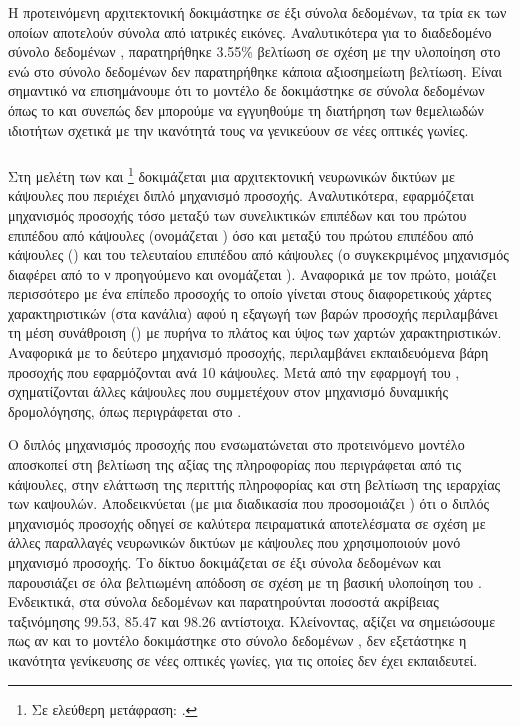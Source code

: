 Η προτεινόμενη αρχιτεκτονική δοκιμάστηκε σε έξι σύνολα δεδομένων, τα τρία εκ των οποίων αποτελούν σύνολα από ιατρικές εικόνες. Αναλυτικότερα για το διαδεδομένο σύνολο δεδομένων , παρατηρήθηκε 3.55\% βελτίωση σε σχέση με την υλοποίηση στο \cite{sabour2017dynamic} ενώ στο σύνολο δεδομένων  δεν παρατηρήθηκε κάποια αξιοσημείωτη βελτίωση. Είναι σημαντικό να επισημάνουμε ότι το μοντέλο δε δοκιμάστηκε σε σύνολα δεδομένων όπως το  και συνεπώς δεν μπορούμε να εγγυηθούμε τη διατήρηση των θεμελιωδών ιδιοτήτων σχετικά με την ικανότητά τους να γενικεύουν σε νέες οπτικές γωνίες.

\subsubsection{}

Στη μελέτη των  και  \footnote{Σε ελεύθερη μετάφραση: .} \cite{huang2020capsnet} δοκιμάζεται μια αρχιτεκτονική νευρωνικών δικτύων με κάψουλες που περιέχει διπλό μηχανισμό προσοχής. Αναλυτικότερα, εφαρμόζεται μηχανισμός προσοχής τόσο μεταξύ των συνελικτικών επιπέδων και του πρώτου επιπέδου από κάψουλες (ονομάζεται ) όσο και μεταξύ του πρώτου επιπέδου από κάψουλες () και του τελευταίου επιπέδου από κάψουλες (ο συγκεκριμένος μηχανισμός διαφέρει από το ν προηγούμενο και ονομάζεται ). Αναφορικά με τον πρώτο, μοιάζει περισσότερο με ένα επίπεδο προσοχής το οποίο γίνεται στους διαφορετικούς χάρτες χαρακτηριστικών (στα κανάλια) αφού η εξαγωγή των βαρών προσοχής περιλαμβάνει τη μέση συνάθροιση () με πυρήνα το πλάτος και ύψος των χαρτών χαρακτηριστικών. Αναφορικά με το δεύτερο μηχανισμό προσοχής, περιλαμβάνει εκπαιδευόμενα βάρη προσοχής που εφαρμόζονται ανά 10 κάψουλες. Μετά από την εφαρμογή του , σχηματίζονται άλλες κάψουλες που συμμετέχουν στον μηχανισμό δυναμικής δρομολόγησης, όπως περιγράφεται στο \cite{sabour2017dynamic}.\par

Ο διπλός μηχανισμός προσοχής που ενσωματώνεται στο προτεινόμενο μοντέλο αποσκοπεί στη βελτίωση της αξίας της πληροφορίας που περιγράφεται από τις κάψουλες, στην ελάττωση της περιττής πληροφορίας και στη βελτίωση της ιεραρχίας των καψουλών. Αποδεικνύεται (με μια διαδικασία που προσομοιάζει ) ότι ο διπλός μηχανισμός προσοχής οδηγεί σε καλύτερα πειραματικά αποτελέσματα σε σχέση με άλλες παραλλαγές νευρωνικών δικτύων με κάψουλες που χρησιμοποιούν μονό μηχανισμό προσοχής. Το δίκτυο δοκιμάζεται σε έξι σύνολα δεδομένων και παρουσιάζει σε όλα βελτιωμένη απόδοση σε σχέση με τη βασική υλοποίηση του \cite{sabour2017dynamic}. Ενδεικτικά, στα σύνολα δεδομένων  και  παρατηρούνται ποσοστά ακρίβειας ταξινόμησης 99.53, 85.47 και 98.26 αντίστοιχα. Κλείνοντας, αξίζει να σημειώσουμε πως αν και το μοντέλο δοκιμάστηκε στο σύνολο δεδομένων , δεν εξετάστηκε η ικανότητα γενίκευσης σε νέες οπτικές γωνίες, για τις οποίες δεν έχει εκπαιδευτεί.


